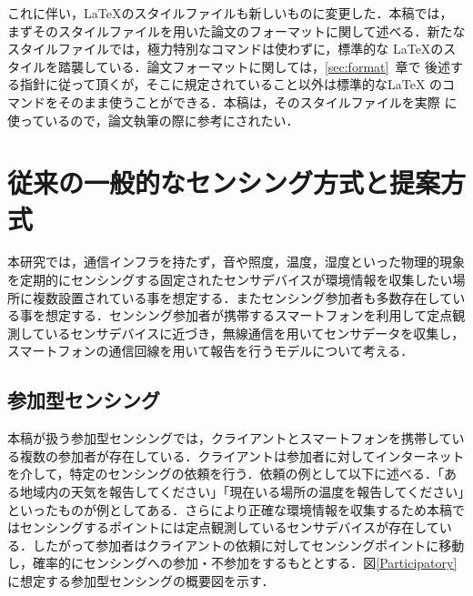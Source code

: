 \documentclass[submit,techrep]{ipsj}
\begin{document}
これに伴い，\LaTeX のスタイルファイルも新しいものに変更した．本稿では，
まずそのスタイルファイルを用いた論文のフォーマットに関して述べる．新たな
スタイルファイルでは，極力特別なコマンドは使わずに，標準的な \LaTeX のス
タイルを踏襲している．論文フォーマットに関しては，\ref{sec:format}~章で
後述する指針に従って頂くが，そこに規定されていること以外は標準的な\LaTeX
のコマンドをそのまま使うことができる．本稿は，そのスタイルファイルを実際
に使っているので，論文執筆の際に参考にされたい．




\section{従来の一般的なセンシング方式と提案方式}
本研究では，通信インフラを持たず，音や照度，温度，湿度といった物理的現象を定期的にセンシングする固定されたセンサデバイスが環境情報を収集したい場所に複数設置されている事を想定する．またセンシング参加者も多数存在している事を想定する．センシング参加者が携帯するスマートフォンを利用して定点観測しているセンサデバイスに近づき，無線通信を用いてセンサデータを収集し，スマートフォンの通信回線を用いて報告を行うモデルについて考える．

\subsection{参加型センシング}
本稿が扱う参加型センシングでは，クライアントとスマートフォンを携帯している複数の参加者が存在している．クライアントは参加者に対してインターネットを介して，特定のセンシングの依頼を行う．依頼の例として以下に述べる．「ある地域内の天気を報告してください」「現在いる場所の温度を報告してください」といったものが例としてある．さらにより正確な環境情報を収集するため本稿ではセンシングするポイントには定点観測しているセンサデバイスが存在している．したがって参加者はクライアントの依頼に対してセンシングポイントに移動し，確率的にセンシングへの参加・不参加をするもととする．図\ref{Participatory}に想定する参加型センシングの概要図を示す．
\end{document}
